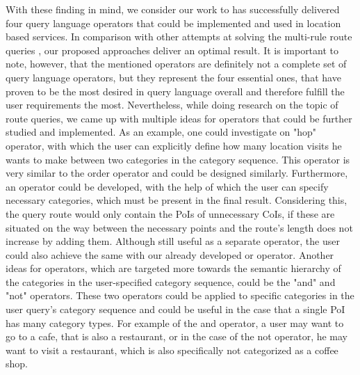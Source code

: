 With these finding in mind, we consider our work to has successfully delivered four query language operators that could be implemented and used in location based services. In comparison with other attempts at solving the multi-rule route queries \cite{multi}, our proposed approaches deliver an optimal result. It is important to note, however, that the mentioned operators are definitely not a complete set of query language operators, but they represent the four essential ones, that have proven to be the most desired in query language overall and therefore fulfill the user requirements the most. Nevertheless, while doing research on the topic of route queries, we came up with multiple ideas for operators that could be further studied and implemented. As an example, one could investigate on "hop" operator, with which the user can explicitly define how many location visits he wants to make between two categories in the category sequence. This operator is very similar to the order operator and could be designed similarly. Furthermore, an operator could be developed, with the help of which the user can specify necessary categories, which must be present in the final result. Considering this, the query route would only contain the PoIs of unnecessary CoIs, if these are situated on the way between the necessary points and the route's length does not increase by adding them. Although still useful as a separate operator, the user could also achieve the same with our already developed or operator. \newline
Another ideas for operators, which are targeted more towards the semantic hierarchy of the categories in the user-specified category sequence, could be the "and" and "not" operators. These two operators could be applied to specific categories in the user query's category sequence and could be useful in the case that a single PoI has many category types. For example of the and operator, a user may want to go to a cafe, that is also a restaurant, or in the case of the not operator, he may want to visit a restaurant, which is also specifically not categorized as a coffee shop. \newline
